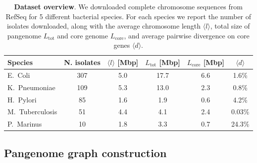 \documentclass[aps,rmp,reprint,superscriptaddress,notitlepage,10pt,onecolumn]{revtex4-1}
\newcommand{\avg}[1]{\langle #1 \rangle}
\begin{document}
\begin{table}[hb]
    \setlength{\tabcolsep}{9pt}
    \begin{tabular}{lccccc}
        \hline\hline
        Species         & N. isolates & $\avg{l}$ [Mbp] & $L_\text{tot}$ [Mbp] & $L_\text{core}$ [Mbp] & $\avg{d}$ \\
        \hline
        E.~Coli         & 307         & 5.0             & 17.7                 & 6.6                   & 1.6\%     \\
        K.~Pneumoniae   & 109         & 5.3             & 13.0                 & 2.3                   & 0.8\%     \\
        H.~Pylori       & 85          & 1.6             & 1.9                  & 0.6                   & 4.2\%     \\
        M.~Tuberculosis & 51          & 4.4             & 4.1                  & 2.4                   & 0.03\%    \\
        P.~Marinus      & 10          & 1.8             & 3.3                  & 0.7                   & 24.3\%    \\
        \hline
    \end{tabular}
    \caption{{\bf Dataset overview}. We downloaded complete chromosome sequences from RefSeq for 5 different bacterial species. For each species we report the number of isolates downloaded, along with the average chromosome length $\avg{l}$, total size of pangenome  $L_\text{tot}$ and core genome $L_\text{core}$, and average pairwise divergence on core genes $\avg{d}$.}
    \label{table:panx-dataset-updated}
\end{table}



\subsection{Pangenome graph construction}
\end{document}
